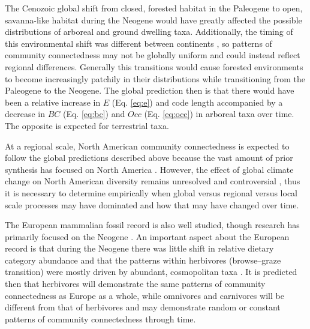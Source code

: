 \documentclass[12pt,letterpaper]{article}
\begin{document}
The Cenozoic global shift from closed, forested habitat in the Paleogene to open, savanna-like habitat during the Neogene would have greatly affected the possible distributions of arboreal and ground dwelling taxa. Additionally, the timing of this environmental shift was different between continents \citep{Stromberg2005,Stromberg2013}, so patterns of community connectedness may not be globally uniform and could instead reflect regional differences. Generally this transitions would cause forested environments to become increasingly patchily in their distributions while transitioning from the Paleogene to the Neogene. The global prediction then is that there would have been a relative increase in \(E\) (Eq. \ref{eq:e}) and code length accompanied by a decrease in \(BC\) (Eq. \ref{eq:bc}) and \(Occ\) (Eq. \ref{eq:occ}) in arboreal taxa over time. The opposite is expected for terrestrial taxa. 

At a regional scale, North American community connectedness is expected to follow the global predictions described above because the vast amount of prior synthesis has focused on North America \citep{Alroy2000g,Alroy1996a,Alroy1998,Barnosky2001a,Simpson1944,Simpson1953,Badgley2013,Blois2009,Figueirido2012,Gunnell1995,Hadly2001}. However, the effect of global climate change on North American diversity remains unresolved and controversial \citep{Alroy2000g,Blois2009,Figueirido2012,Barnosky2001a}, thus it is necessary to determine empirically when global versus regional versus local scale processes may have dominated and how that may have changed over time.

The European mammalian fossil record is also well studied, though research has primarily focused on the Neogene \citep{Jernvall2002,Jernvall2004,Liow2008,Raia2006,Raia2005,Raia2011c}. An important aspect about the European record is that during the Neogene there was little shift in relative dietary category abundance \citep{Jernvall2004} and that the patterns within herbivores (browse--graze transition) were mostly driven by abundant, cosmopolitan taxa \citep{Jernvall2002}. It is predicted then that herbivores will demonstrate the same patterns of community connectedness as Europe as a whole, while omnivores and carnivores will be different from that of herbivores and may demonstrate random or constant patterns of community connectedness through time. 
\end{document}
